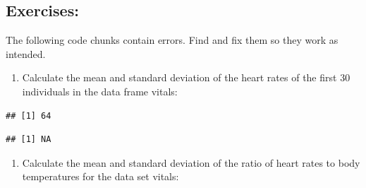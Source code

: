 \documentclass[
]{book}
\newenvironment{Shaded}{\begin{snugshade}}{\end{snugshade}}
\newcommand{\DecValTok}[1]{\textcolor[rgb]{0.00,0.00,0.81}{#1}}
\newcommand{\KeywordTok}[1]{\textcolor[rgb]{0.13,0.29,0.53}{\textbf{#1}}}
\newcommand{\NormalTok}[1]{#1}
\newcommand{\OperatorTok}[1]{\textcolor[rgb]{0.81,0.36,0.00}{\textbf{#1}}}
\providecommand{\tightlist}{%
  \setlength{\itemsep}{0pt}\setlength{\parskip}{0pt}}
\theoremstyle{definition}
\theoremstyle{definition}
\theoremstyle{definition}
\theoremstyle{remark}
\begin{document}
\hypertarget{exercises-9}{%
\subsection{Exercises:}\label{exercises-9}}

The following code chunks contain errors. Find and fix them so they work as intended.

\begin{enumerate}
\def\labelenumi{\arabic{enumi}.}
\tightlist
\item
  Calculate the mean and standard deviation of the heart rates of the first 30 individuals in the data frame vitals:
\end{enumerate}

\begin{Shaded}
\end{Shaded}

\begin{verbatim}
## [1] 64
\end{verbatim}

\begin{Shaded}
\end{Shaded}

\begin{verbatim}
## [1] NA
\end{verbatim}

\begin{enumerate}
\def\labelenumi{\arabic{enumi}.}
\setcounter{enumi}{1}
\tightlist
\item
  Calculate the mean and standard deviation of the ratio of heart rates to body temperatures for the data set vitals:
\end{enumerate}

\begin{Shaded}
\end{Shaded}
\end{document}

